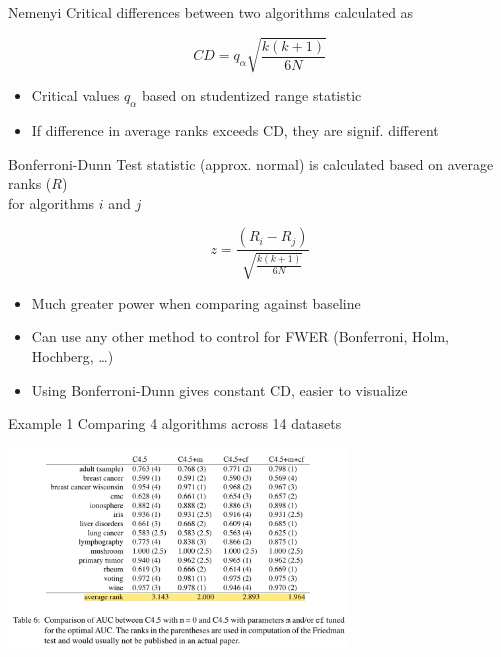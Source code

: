 \documentclass[aspectratio=169,12pt]{beamer}
\providecommand{\tightlist}{%
  \setlength{\itemsep}{2pt}\setlength{\parskip}{0pt}}
\begin{document}
\begin{frame}{Nemenyi}
\label{nemenyi}
Critical differences between two algorithms calculated as

\[CD = q_\alpha \sqrt{\frac{k(k+1)}{6N}}\]

\begin{itemize}
\tightlist
\item
  Critical values \(q_\alpha\) based on studentized range statistic
\item
  If difference in average ranks exceeds CD, they are signif. different
\end{itemize}
\end{frame}

\begin{frame}{Bonferroni-Dunn}
\label{bonferroni-dunn}
Test statistic (approx. normal) is calculated based on average ranks
(\(R\))\\
for algorithms \(i\) and \(j\)

\[z = \frac{(R_i - R_j)}{\sqrt{\frac{k(k+1)}{6N}}}\]

\begin{itemize}
\tightlist
\item
  Much greater power when comparing against baseline
\item
  Can use any other method to control for FWER (Bonferroni, Holm,
  Hochberg, \ldots)
\item
  Using Bonferroni-Dunn gives constant CD, easier to visualize
\end{itemize}
\end{frame}

\begin{frame}{Example 1}
\label{example-1}
Comparing 4 algorithms across 14 datasets

\begin{center}
\includegraphics[width=3.52in,height=\textheight]{img/table6.png}
\end{center}
\end{frame}
\end{document}
